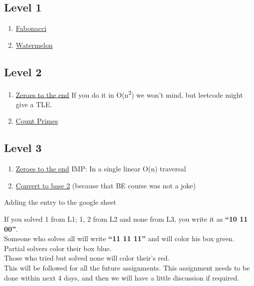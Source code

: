 \documentclass[13pt,oneside,a4paper]{book}
\begin{document}
\subsection{Level 1}
\begin{enumerate}
        \item \href{https://leetcode.com/problems/fibonacci-number/}{Fabonacci}
        \item \href{https://codeforces.com/contest/4/problem/A}{Watermelon}
\end{enumerate}

\subsection{Level 2}
\begin{enumerate}
        \item \href{https://leetcode.com/problems/move-zeroes/}{Zeroes to the end} If you do it in O(n\textsuperscript{2}) we won't mind, but leetcode might give a TLE.
        \item \href{https://leetcode.com/problems/count-primes/}{Count Primes}
\end{enumerate}

\subsection{Level 3}
\begin{enumerate}
        \item \href{https://leetcode.com/problems/move-zeroes/}{Zeroes to the end} IMP: In a single linear O(n) traversal
        \item \href{https://leetcode.com/problems/convert-to-base-2/}{Convert to base 2} (because that BE course was not a joke)
\end{enumerate}

Adding the entry to the google sheet

If you solved 1 from L1; 1, 2 from L2 and none from L3, you write it as \textbf{``10 11 00''}.\\
Someone who solves all will write \textbf{``11 11 11''} and will color his box green.\\
Partial solvers color their box blue.\\
Those who tried but solved none will color their's red.\\

This will be followed for all the future assignments. This assignment needs to be done within next 4 days, and then we will have a little discussion if required.
\end{document}
